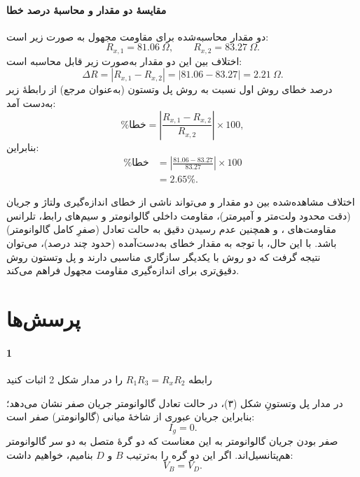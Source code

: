 \documentclass[a4paper, 11pt]{article}
\begin{document}
\paragraph{مقایسهٔ دو مقدار و محاسبهٔ درصد خطا}

دو مقدار محاسبه‌شده برای مقاومت مجهول به صورت زیر است:
\[
R_{x,1}=81.06~\Omega, 
\qquad
R_{x,2}=83.27~\Omega.
\]
اختلاف بین این دو مقدار به‌صورت زیر قابل محاسبه است:
\[
\Delta R = |R_{x,1}-R_{x,2}| = |81.06-83.27| = 2.21~\Omega.
\]
درصد خطای روش اول نسبت به روش پل وتستون (به‌عنوان مرجع) از رابطهٔ زیر به‌دست آمد:
\begin{equation}
\%\text{خطا}=
\left|
\frac{R_{x,1}-R_{x,2}}{R_{x,2}}
\right|\times 100,
\end{equation}
بنابراین:
\begin{align}
\%\text{خطا}
&=
\left|
\frac{81.06-83.27}{83.27}
\right|\times 100 \nonumber\\
&=2.65\%.
\end{align}

اختلاف مشاهده‌شده بین دو مقدار  و  می‌تواند ناشی از خطای اندازه‌گیری ولتاژ و جریان (دقت محدود ولت‌متر و آمپرمتر)، مقاومت داخلی گالوانومتر و سیم‌های رابط، تلرانس مقاومت‌های ، و همچنین عدم رسیدن دقیق به حالت تعادل (صفرِ کامل گالوانومتر) باشد. با این حال، با توجه به مقدار خطای به‌دست‌آمده (حدود چند درصد)، می‌توان نتیجه گرفت که دو روش با یکدیگر سازگاری مناسبی دارند و پل وتستون روش دقیق‌تری برای اندازه‌گیری مقاومت مجهول فراهم می‌کند.
 


\section*{پرسش‌ها}
\paragraph{1} رابطه $R_1 R_3 = R_x R_2$ را در مدار شکل 2 اثبات کنید


در مدار پل وتستونِ شکل (۳)، در حالت تعادل گالوانومتر جریان صفر نشان می‌دهد؛ بنابراین جریان عبوری از شاخهٔ میانی (گالوانومتر) صفر است:
\begin{equation}
I_g = 0.
\end{equation}
صفر بودن جریان گالوانومتر به این معناست که دو گرهٔ متصل به دو سر گالوانومتر هم‌پتانسیل‌اند. اگر این دو گره را به‌ترتیب $B$ و $D$ بنامیم، خواهیم داشت:
\begin{equation}
V_B = V_D.
\label{eq:VBVD}
\end{equation}
\end{document}

